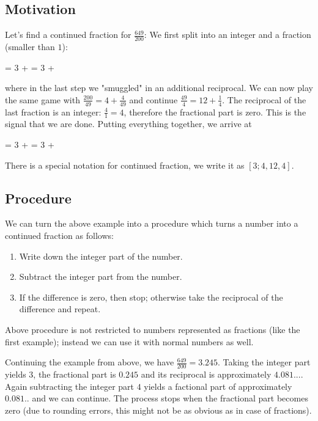 
\subsection{Motivation}

Let's find a continued fraction for $\frac{649}{200}$: We first split into an integer and a fraction (smaller than $1$):

\bee
{} = 3 + = 3 + 
\eee

where in the last step we "smuggled" in an additional reciprocal. We can now play the same game with $\frac{200}{49} = 4 + \frac{4}{49}$ and continue $\frac{49}{4} = 12 + \frac{1}{4}$. The reciprocal of the last fraction is an integer: $\frac{4}{1}= 4$, therefore the fractional part is zero. This is the signal that we are done. Putting everything together, we arrive at

\bee
{} = 3 +  = 3 + 
\eee

There is a special notation for continued fraction, we write it as $[3;4,12,4]$.

\subsection{Procedure}

We can turn the above example into a procedure which turns a number into a continued fraction as follows:

\begin{enumerate}
	\item Write down the integer part of the number.
	\item Subtract the integer part from the number.
	\item If the difference is zero, then stop; otherwise take the reciprocal of the difference and repeat.
\end{enumerate}

Above procedure is not restricted to numbers represented as fractions (like the first example); instead we can use it with normal numbers as well.

Continuing the example from above, we have $\frac{649}{200} = 3.245$. Taking the integer part yields $3$, the fractional part is $0.245$ and its reciprocal is approximately $4.081...$. Again subtracting the integer part $4$ yields a factional part of approximately $0.081..$ and we can continue. The process stops when the fractional part becomes zero (due to rounding errors, this might not be as obvious as in case of fractions).

